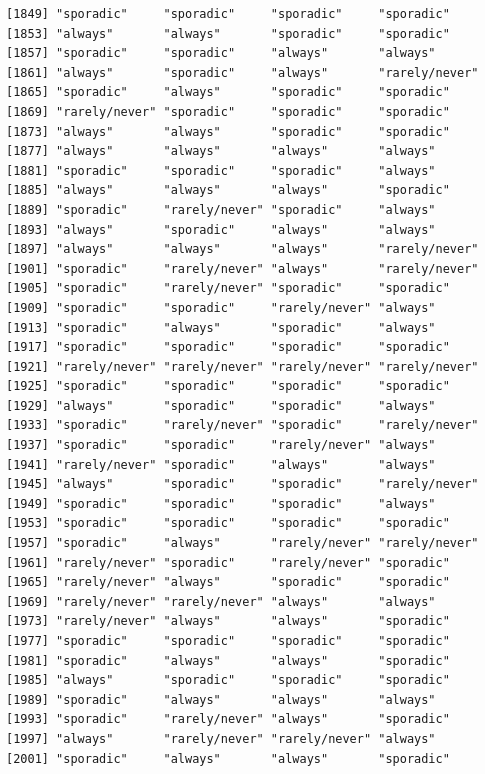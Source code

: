 \documentclass[
  letterpaper,
  DIV=11,
  numbers=noendperiod]{scrartcl}
\begin{document}
\begin{verbatim}
[1849] "sporadic"     "sporadic"     "sporadic"     "sporadic"    
[1853] "always"       "always"       "sporadic"     "sporadic"    
[1857] "sporadic"     "sporadic"     "always"       "always"      
[1861] "always"       "sporadic"     "always"       "rarely/never"
[1865] "sporadic"     "always"       "sporadic"     "sporadic"    
[1869] "rarely/never" "sporadic"     "sporadic"     "sporadic"    
[1873] "always"       "always"       "sporadic"     "sporadic"    
[1877] "always"       "always"       "always"       "always"      
[1881] "sporadic"     "sporadic"     "sporadic"     "always"      
[1885] "always"       "always"       "always"       "sporadic"    
[1889] "sporadic"     "rarely/never" "sporadic"     "always"      
[1893] "always"       "sporadic"     "always"       "always"      
[1897] "always"       "always"       "always"       "rarely/never"
[1901] "sporadic"     "rarely/never" "always"       "rarely/never"
[1905] "sporadic"     "rarely/never" "sporadic"     "sporadic"    
[1909] "sporadic"     "sporadic"     "rarely/never" "always"      
[1913] "sporadic"     "always"       "sporadic"     "always"      
[1917] "sporadic"     "sporadic"     "sporadic"     "sporadic"    
[1921] "rarely/never" "rarely/never" "rarely/never" "rarely/never"
[1925] "sporadic"     "sporadic"     "sporadic"     "sporadic"    
[1929] "always"       "sporadic"     "sporadic"     "always"      
[1933] "sporadic"     "rarely/never" "sporadic"     "rarely/never"
[1937] "sporadic"     "sporadic"     "rarely/never" "always"      
[1941] "rarely/never" "sporadic"     "always"       "always"      
[1945] "always"       "sporadic"     "sporadic"     "rarely/never"
[1949] "sporadic"     "sporadic"     "sporadic"     "always"      
[1953] "sporadic"     "sporadic"     "sporadic"     "sporadic"    
[1957] "sporadic"     "always"       "rarely/never" "rarely/never"
[1961] "rarely/never" "sporadic"     "rarely/never" "sporadic"    
[1965] "rarely/never" "always"       "sporadic"     "sporadic"    
[1969] "rarely/never" "rarely/never" "always"       "always"      
[1973] "rarely/never" "always"       "always"       "sporadic"    
[1977] "sporadic"     "sporadic"     "sporadic"     "sporadic"    
[1981] "sporadic"     "always"       "always"       "sporadic"    
[1985] "always"       "sporadic"     "sporadic"     "sporadic"    
[1989] "sporadic"     "always"       "always"       "always"      
[1993] "sporadic"     "rarely/never" "always"       "sporadic"    
[1997] "always"       "rarely/never" "rarely/never" "always"      
[2001] "sporadic"     "always"       "always"       "sporadic"    

\end{verbatim}
\end{document}

